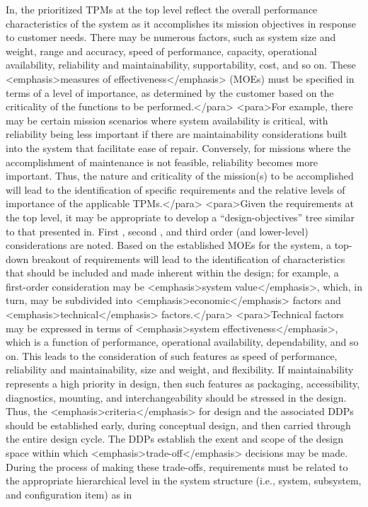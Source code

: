 In, the prioritized TPMs at the top level reflect the overall performance characteristics of the system as it accomplishes its mission objectives in response to customer needs. There may be numerous factors, such as system size and weight, range and accuracy, speed of performance, capacity, operational availability, reliability and maintainability, supportability, cost, and so on. These <emphasis>measures of effectiveness</emphasis> (MOEs) must be specified in terms of a level of importance, as determined by the customer based on the criticality of the functions to be performed.</para>
<para>For example, there may be certain mission scenarios where system availability is critical, with reliability being less important if there are maintainability considerations built into the system that facilitate ease of repair. Conversely, for missions where the accomplishment of maintenance is not feasible, reliability becomes more important. Thus, the nature and criticality of the mission(s) to be accomplished will lead to the identification of specific requirements and the relative levels of importance of the applicable TPMs.</para>
<para>Given the requirements at the top level, it may be appropriate to develop a “design-objectives” tree similar to that presented in. First , second , and third order (and lower-level) considerations are noted. Based on the established MOEs for the system, a top-down breakout of requirements will lead to the identification of characteristics that should be included and made inherent within the design; for example, a first-order consideration may be <emphasis>system value</emphasis>, which, in turn, may be subdivided into <emphasis>economic</emphasis> factors and <emphasis>technical</emphasis> factors.</para>
<para>Technical factors may be expressed in terms of <emphasis>system effectiveness</emphasis>, which is a function of performance, operational availability, dependability, and so on. This leads to the consideration of such features as speed of performance, reliability and maintainability, size and weight, and flexibility. If maintainability represents a high priority in design, then such features as packaging, accessibility, diagnostics, mounting, and interchangeability should be stressed in the design. Thus, the <emphasis>criteria</emphasis> for design and the associated DDPs should be established early, during conceptual design, and then carried through the entire design cycle. The DDPs establish the exent and scope of the design space within which <emphasis>trade-off</emphasis> decisions may be made. During the process of making these trade-offs, requirements must be related to the appropriate hierarchical level in the system structure (i.e., system, subsystem, and configuration item) as in 


